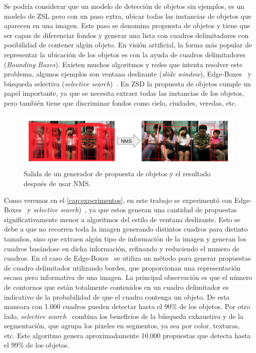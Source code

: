 Se podría considerar que un modelo de detección de objetos sin ejemplos, es un modelo de ZSL pero con un paso extra, ubicar todas las instancias de objetos que aparecen en una imagen. Este paso se denomina propuesta de objetos y tiene que ser capas de diferenciar fondos y generar una lista con cuadros delimitadores con posibilidad de contener algún objeto. En visión artificial, la forma más popular de representar la ubicación de los objetos es con la ayuda de cuadros delimitadores (\textit{Bounding Boxes}). Existen muchos algoritmos y redes que intenta resolver este problema, algunos ejemplos son ventana deslizante (\textit{slide window}), Edge-Boxes~\cite{zitnick2014edge} y búsqueda selectiva (\textit{selective search})~\cite{uijlings2013selective}. En ZSD la propuesta de objetos cumple un papel importante, ya que se necesita extraer todas las instancias de los objetos, pero también tiene que discriminar fondos como cielo, ciudades, veredas, etc.\\ 

\begin{figure}[]
	\centering
	\includegraphics[width=1\textwidth]{img/NMS.png}
	\caption{Salida de un generador de propuesta de objetos y el resultado después de  usar NMS.}
	\label{fig:NMS}
\end{figure}

Como veremos en el \autoref{cap:experimentos}, en este trabajo se experimentó con Edge-Boxes~\cite{zitnick2014edge} y \textit{selective search})~\cite{uijlings2013selective}, ya que estos generan una cantidad de propuestas significativamente menor a algoritmos del estilo de ventana deslizante. Esto se debe a que no recorren toda la imagen generando distintos cuadros para distinto tamaños, sino que extraen algún tipo de información de la imagen y generan los cuadros basándose en dicha información, refinando y reduciendo el numero de cuadros. En el caso de Edge-Boxes~\cite{zitnick2014edge} se utiliza un método para generar propuestas de cuadro delimitador utilizando bordes, que proporcionan una representación escasa pero informativa de una imagen. La principal observación es que el número de contornos que están totalmente contenidos en un cuadro delimitador es indicativo de la probabilidad de que el cuadro contenga un objeto. De esta maneara con 1.000 cuadros pueden detectar hasta el 90\% de los objetos. Por otro lado, \textit{selective search}~\cite{uijlings2013selective} combina los beneficios de la búsqueda exhaustiva y de la segmentación, que agrupa los pixeles en segmentos, ya sea por color, texturas, etc. Este algoritmo genera aproximadamente 10.000 propuestas que detecta hasta el 99\% de los objetos.

